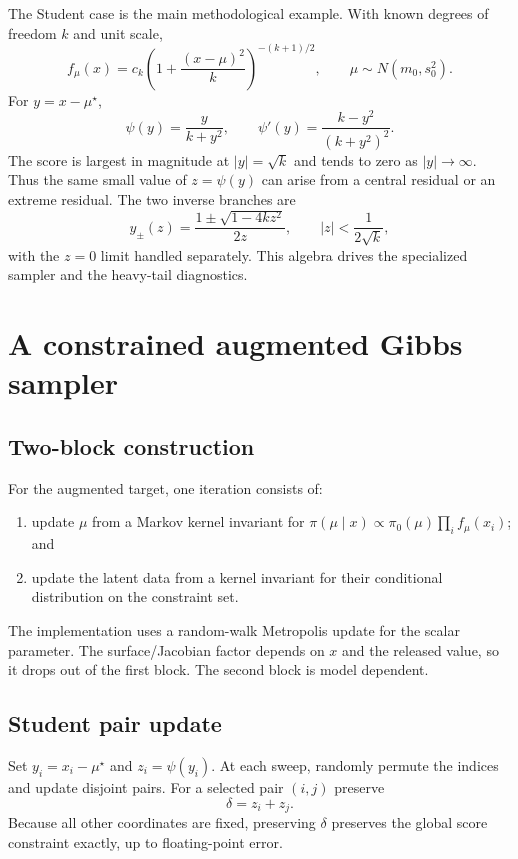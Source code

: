 \documentclass[smallextended,natbib,runningheads]{svjour3}
\begin{document}
The Student case is the main methodological example.  With known degrees of
freedom $k$ and unit scale,
\begin{equation}
 f_\mu(x)=c_k\left(1+\frac{(x-\mu)^2}{k}\right)^{-(k+1)/2},
 \qquad \mu\sim N(m_0,s_0^2).
 \label{eq:student_model}
\end{equation}
For $y=x-\mu^\star$,
\[
 \psi(y)=\frac{y}{k+y^2},\qquad
 \psi'(y)=\frac{k-y^2}{(k+y^2)^2}.
\]
The score is largest in magnitude at $|y|=\sqrt{k}$ and tends to zero as
$|y|\to\infty$.  Thus the same small value of $z=\psi(y)$ can arise from a
central residual or an extreme residual.  The two inverse branches are
\begin{equation}
 y_\pm(z)=\frac{1\pm\sqrt{1-4kz^2}}{2z},
 \qquad |z|<\frac{1}{2\sqrt{k}},
 \label{eq:student_inverse}
\end{equation}
with the $z=0$ limit handled separately.  This algebra drives the specialized
sampler and the heavy-tail diagnostics.

\section{A constrained augmented Gibbs sampler}
\label{sec:gibbs}

\subsection{Two-block construction}

For the augmented target, one iteration consists of:
\begin{enumerate}
  \item update $\mu$ from a Markov kernel invariant for
  $\pi(\mu\mid x)\propto\pi_0(\mu)\prod_i f_\mu(x_i)$; and
  \item update the latent data from a kernel invariant for their conditional
  distribution on the constraint set.
\end{enumerate}
The implementation uses a random-walk Metropolis update for the scalar
parameter.  The surface/Jacobian factor depends on $x$ and the released value,
so it drops out of the first block.  The second block is model dependent.

\subsection{Student pair update}
\label{sec:student_pair_update}

Set $y_i=x_i-\mu^\star$ and $z_i=\psi(y_i)$.  At each sweep, randomly permute
the indices and update disjoint pairs.  For a selected pair $(i,j)$ preserve
\[
 \delta=z_i+z_j.
\]
Because all other coordinates are fixed, preserving $\delta$ preserves the
global score constraint exactly, up to floating-point error.
\end{document}
